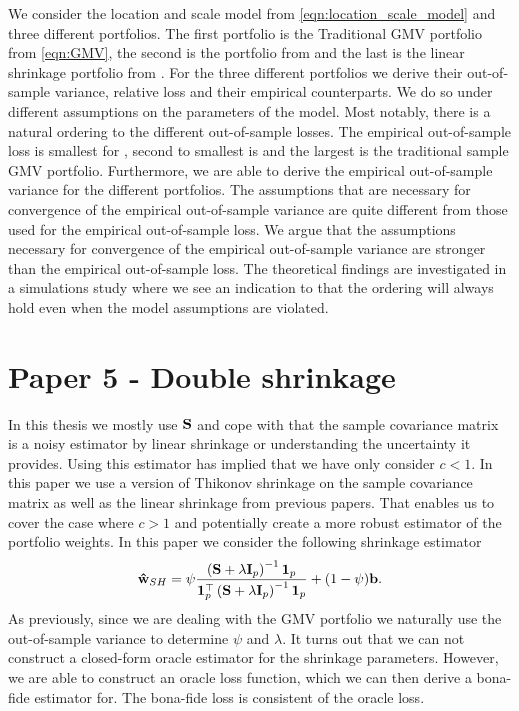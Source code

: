 \documentclass[oneside]{book}\usepackage{knitr}
\begin{document}
We consider the location and scale model from \eqref{eqn:location_scale_model} and three different portfolios. 
The first portfolio is the Traditional GMV portfolio from \eqref{eqn:GMV}, the second is the portfolio from \citet{bodnar2018estimation} and the last is the linear shrinkage portfolio from \citet{frahm2010}.
For the three different portfolios we derive their out-of-sample variance, relative loss and their empirical counterparts. 
We do so under different assumptions on the parameters of the model.
Most notably, there is a natural ordering to the different out-of-sample losses.
The empirical out-of-sample loss is smallest for \citet{bodnar2018estimation}, second to smallest is \citet{frahm2010} and the largest is the traditional sample GMV portfolio.
Furthermore, we are able to derive the empirical out-of-sample variance for the different portfolios.
The assumptions that are necessary for convergence of the empirical out-of-sample variance are quite different from those used for the empirical out-of-sample loss.
We argue that the assumptions necessary for convergence of the empirical out-of-sample variance are stronger than the empirical out-of-sample loss.
The theoretical findings are investigated in a simulations study where we see an indication to that the ordering will always hold even when the model assumptions are violated.

\section{Paper 5 - Double shrinkage}\label{sec:paper5}
In this thesis we mostly use $\mathbf{S}$ and cope with that the sample covariance matrix is a noisy estimator by linear shrinkage or understanding the uncertainty it provides.
Using this estimator has implied that we have only consider $c<1$.
In this paper we use a version of Thikonov shrinkage on the sample covariance matrix as well as the linear shrinkage from previous papers. 
That enables us to cover the case where $c>1$ and potentially create a more robust estimator of the portfolio weights.
In this paper we consider the following shrinkage estimator
$$
\mathbf{\hat{w}}_{SH} = \psi \frac{\left(\mathbf{S} + \lambda \mathbf{I}_p \right)^{-1}\mathbf{1}_p}{\mathbf{1}_p^\top\left(\mathbf{S} + \lambda \mathbf{I}_p \right)^{-1}\mathbf{1}_p} + (1-\psi)\mathbf{b}.
$$
As previously, since we are dealing with the GMV portfolio we naturally use the out-of-sample variance to determine $\psi$ and $\lambda$.
It turns out that we can not construct a closed-form oracle estimator for the shrinkage parameters.
However, we are able to construct an oracle loss function, which we can then derive a bona-fide estimator for.
The bona-fide loss is consistent of the oracle loss.
\end{document}
